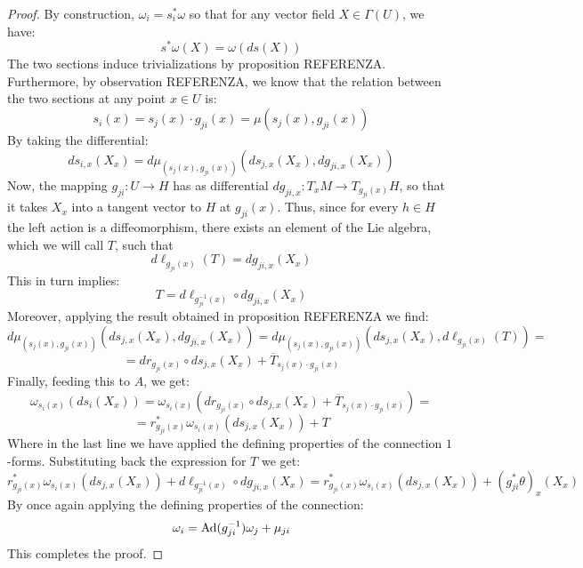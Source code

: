 \documentclass[12pt,a4paper]{report}
\theoremstyle{definition}
\theoremstyle{Theorem}
\theoremstyle{definition}
\theoremstyle{definition}
\begin{document}
	\begin{proof}
		By construction, $\omega_i=s_i^*\omega$ so that for any vector field $X\in \Gamma(U)$, we have:
		$$s^*\omega(X)=\omega(ds(X))$$
		The two sections induce trivializations by proposition REFERENZA. Furthermore, by observation REFERENZA, we know that the relation between the two sections at any point $x\in U$ is:
		$$s_i(x)=s_j(x)\cdot g_{ji}(x)=\mu(s_j(x),g_{ji}(x))$$
		By taking the differential:
		$$ds_{i,x}(X_x)=d\mu_{(s_{j}(x), g_{ji}(x))}(ds_{j,x}(X_x),dg_{ji,x}(X_x))$$
		Now, the mapping $g_{ji}:U\rightarrow H$ has as differential $dg_{ji,x}:T_xM\rightarrow T_{g_{ji}(x)}H$, so that it takes $X_x$ into a tangent vector to $H$ at $g_{ji}(x)$. Thus, since for every $h\in H$ the left action is a diffeomorphism, there exists an element of the Lie algebra, which we will call $T$, such that 
		$$d\ell_{g_{ji}(x)}(T)=dg_{ji,x}(X_x)$$
		This in turn implies:
		$$T=d\ell_{g^{-1}_{ji}(x)}\circ dg_{ji,x}(X_x)$$
		Moreover, applying the result obtained in proposition REFERENZA we find:
		$$d\mu_{(s_{j}(x), g_{ji}(x))}(ds_{j,x}(X_x),dg_{ji,x}(X_x))=d\mu_{(s_{j}(x), g_{ji}(x))}(ds_{j,x}(X_x),d\ell_{g_{ji}(x)}(T))=$$
		$$=dr_{g_{ji}(x)}\circ ds_{j,x}(X_x)+\overline{T}_{s_{j}(x)\cdot g_{ji}(x)}$$
		Finally, feeding this to $A$, we get:
		$$\omega_{s_i(x)}(ds_i(X_x))=\omega_{s_i(x)}(dr_{g_{ji}(x)}\circ ds_{j,x}(X_x)+\overline{T}_{s_{j}(x)\cdot g_{ji}(x)})=$$$$=r^*_{g_{ji}(x)}\omega_{{s_i(x)}}(ds_{j,x}(X_x))+T$$
		Where in the last line we have applied the defining properties of the connection $1$-forms. Substituting back the expression for $T$ we get:
		$$r^*_{g_{ji}(x)}\omega_{{s_i(x)}}(ds_{j,x}(X_x))+d\ell_{g^{-1}_{ji}(x)}\circ dg_{ji,x}(X_x)=r^*_{g_{ji}(x)}\omega_{{s_i(x)}}(ds_{j,x}(X_x))+(g^*_{ji}\theta)_x(X_x)$$
		By once again applying the defining properties of the connection:
		$$\omega_i=\hbox{Ad}(g_{ji}^{-1})\omega_j+\mu_{ji}$$
		This completes the proof.
	\end{proof}
\end{document}
